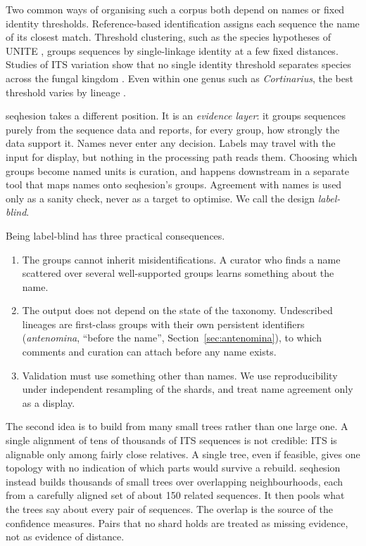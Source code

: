 \documentclass[11pt,a4paper]{article}
\newcommand{\seqhesion}{\textsf{seqhesion}}
\begin{document}
Two common ways of organising such a corpus both depend on names or fixed identity thresholds.
Reference-based identification assigns each sequence the name of its closest match. Threshold
clustering, such as the species hypotheses of UNITE \citep{koljalg2013unite,abarenkov2024unite},
groups sequences by single-linkage identity at a few fixed distances. Studies of ITS variation
show that no single identity threshold separates species across the fungal kingdom
\citep{nilsson2008its,vu2019its}. Even within one genus such as \emph{Cortinarius}, the best
threshold varies by lineage \citep{garnica2016cortinarius}.

\seqhesion{} takes a different position. It is an \emph{evidence layer}: it groups sequences
purely from the sequence data and reports, for every group, how strongly the data support it.
Names never enter any decision. Labels may travel with the input for display, but nothing in the
processing path reads them. Choosing which groups become named units is curation, and happens
downstream in a separate tool that maps names onto \seqhesion's groups. Agreement with names is
used only as a sanity check, never as a target to optimise. We call the design \emph{label-blind}.

Being label-blind has three practical consequences.
\begin{enumerate}
  \item The groups cannot inherit misidentifications. A curator who finds a name scattered over
        several well-supported groups learns something about the name.
  \item The output does not depend on the state of the taxonomy. Undescribed lineages are first-class
        groups with their own persistent identifiers (\emph{antenomina}, ``before the name'',
        Section~\ref{sec:antenomina}), to which comments and curation can attach before any name exists.
  \item Validation must use something other than names. We use reproducibility under independent
        resampling of the shards, and treat name agreement only as a display.
\end{enumerate}

The second idea is to build from many small trees rather than one large one. A single alignment of
tens of thousands of ITS sequences is not credible: ITS is alignable only among fairly close
relatives. A single tree, even if feasible, gives one topology with no indication of which parts
would survive a rebuild. \seqhesion{} instead builds thousands of small trees over overlapping
neighbourhoods, each from a carefully aligned set of about 150 related sequences. It then pools
what the trees say about every pair of sequences. The overlap is the source of the confidence
measures. Pairs that no shard holds are treated as missing evidence, not as evidence of distance.
\end{document}
